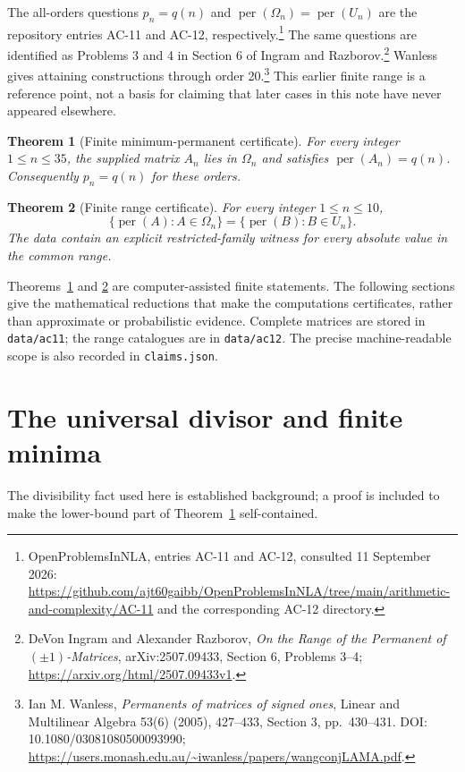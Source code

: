 \documentclass[11pt,a4paper]{article}
\newtheorem{theorem}{Theorem}
\theoremstyle{remark}\newtheorem{remark}[theorem]{Remark}
\DeclareMathOperator{\per}{per}
\newcommand{\Om}{\Omega}
\newcommand{\MaxMinOrder}{35}
\newcommand{\MaxRangeOrder}{10}
\begin{document}
The all-orders questions $p_n=q(n)$ and $\per(\Om_n)=\per(U_n)$ are the repository entries AC-11 and AC-12, respectively.\footnote{OpenProblemsInNLA, entries AC-11 and AC-12, consulted 11 September 2026: \url{https://github.com/ajt60gaibb/OpenProblemsInNLA/tree/main/arithmetic-and-complexity/AC-11} and the corresponding AC-12 directory.} The same questions are identified as Problems 3 and 4 in Section 6 of Ingram and Razborov.\footnote{DeVon Ingram and Alexander Razborov, \emph{On the Range of the Permanent of $(\pm1)$-Matrices}, arXiv:2507.09433, Section 6, Problems 3--4; \url{https://arxiv.org/html/2507.09433v1}.} Wanless gives attaining constructions through order 20.\footnote{Ian M. Wanless, \emph{Permanents of matrices of signed ones}, Linear and Multilinear Algebra 53(6) (2005), 427--433, Section 3, pp.\ 430--431. DOI: 10.1080/03081080500093990; \url{https://users.monash.edu.au/~iwanless/papers/wangconjLAMA.pdf}.} This earlier finite range is a reference point, not a basis for claiming that later cases in this note have never appeared elsewhere.

\begin{theorem}[Finite minimum-permanent certificate]\label{thm:minimum}
For every integer $1\leq n\leq\MaxMinOrder$, the supplied matrix $A_n$ lies in $\Om_n$ and satisfies $\per(A_n)=q(n)$. Consequently $p_n=q(n)$ for these orders.
\end{theorem}

\begin{theorem}[Finite range certificate]\label{thm:range}
For every integer $1\leq n\leq\MaxRangeOrder$,
\[
 \{\per(A):A\in\Om_n\}=\{\per(B):B\in U_n\}.
\]
The data contain an explicit restricted-family witness for every absolute value in the common range.
\end{theorem}

Theorems~\ref{thm:minimum} and \ref{thm:range} are computer-assisted finite statements. The following sections give the mathematical reductions that make the computations certificates, rather than approximate or probabilistic evidence. Complete matrices are stored in \texttt{data/ac11}; the range catalogues are in \texttt{data/ac12}. The precise machine-readable scope is also recorded in \texttt{claims.json}.

\section{The universal divisor and finite minima}
The divisibility fact used here is established background; a proof is included to make the lower-bound part of Theorem~\ref{thm:minimum} self-contained.
\end{document}
